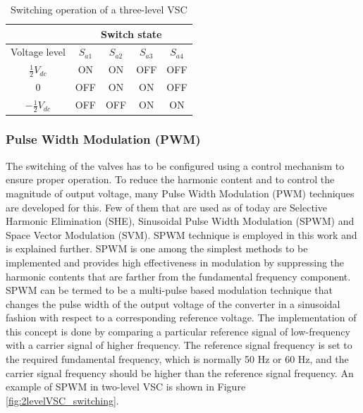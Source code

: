 \begin{table}[H]
\centering
\begin{tabular}{c|c|c|c|c|}
\cline{2-5}
                                          & \multicolumn{4}{c|}{Switch state}     \\ \hline
\multicolumn{1}{|c|}{Voltage level}       & $S_{a1}$ & $S_{a2}$ & $S_{a3}$ & $S_{a4}$ \\ \hline
\multicolumn{1}{|c|}{$\frac{1}{2}V_{dc}$}  & ON      & ON      & OFF     & OFF     \\ \hline
\multicolumn{1}{|c|}{0}                   & OFF     & ON      & ON      & OFF     \\ \hline
\multicolumn{1}{|c|}{$-\frac{1}{2}V_{dc}$} & OFF     & OFF     & ON      & ON      \\ \hline
\end{tabular}
\caption{Switching operation of a three-level VSC \cite{noauthor_appendix_2014-1}}
\label{tab:3level_switching}
\end{table}

\subsubsection{Pulse Width Modulation (PWM)}
The switching of the valves has to be configured using a control mechanism to ensure proper operation. To reduce the harmonic content and to control the magnitude of output voltage, many Pulse Width Modulation (\gls{PWM}) techniques are developed for this. Few of them that are used as of today are Selective Harmonic Elimination (SHE), Sinusoidal Pulse Width Modulation (SPWM) and Space Vector Modulation (SVM). SPWM technique is employed in this work and is explained further. SPWM is one among the simplest methods to be implemented and provides high effectiveness in modulation by suppressing the harmonic contents that are farther from the fundamental frequency component. SPWM can be termed to be a multi-pulse based modulation technique that changes the pulse width of the output voltage of the converter in a sinusoidal fashion with respect to a corresponding reference voltage. The implementation of this concept is done by comparing a particular reference signal of low-frequency with a carrier signal of higher frequency. The reference signal frequency is set to the required fundamental frequency, which is normally 50 Hz or 60 Hz, and the carrier signal frequency should be higher than the reference signal frequency. An example of SPWM in two-level \gls{VSC} is shown in Figure \ref{fig:2levelVSC_switching}.

